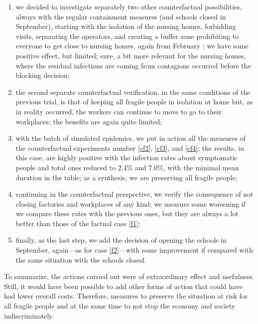 \documentclass[11pt]{article}
\begin{document}
\begin{enumerate}
\item\label{cf3} we decided to investigate separately two other counterfactual possibilities, always with the regular containment measures (and schools closed in September), starting with the isolation of the nursing homes, forbidding visits, separating the operators, and creating a buffer zone prohibiting to everyone to get close to nursing homes, again from February ; we have some positive effect, but limited; sure, a bit more relevant for the nursing homes, where the residual infections are coming from contagions occurred before the blocking decision;


\item\label{cf4} the second separate counterfactual verification, in the same conditions of the previous trial, is that of keeping all fragile people in isolation at home but, as in reality occurred, the workers can continue to move to go to their workplaces; the benefits are again quite limited;

\item\label{cf5} with the  batch of simulated epidemics, we put in action all the measures of the counterfactual experiments number \ref{cf2}, \ref{cf3}, and \ref{cf4}; the results, in this case, are highly positive with the infection rates about symptomatic people and total ones reduced to 2.4\% and 7.0\%, with the minimal mean duration in the table; as a synthesis, we are preserving all fragile people;

\item\label{cf6} continuing in the counterfactual perspective, we verify the consequence of not closing factories and workplaces of any kind; we measure some worsening if we compare these rates with the previous ones, but they are always a lot better than those of the factual case \ref{f1};

\item\label{cf7} finally, as the last step, we add the decision of opening the schools in September, again---as for case \ref{f2}---with some improvement if compared with the same situation with the schools closed.

\end{enumerate}

To summarize, the actions carried out were of extraordinary effect and usefulness. Still, it would have been possible to add other forms of action that could have had lower overall costs. Therefore, measures to preserve the situation at risk for all fragile people and at the same time to not stop the economy and society indiscriminately.
\end{document}
